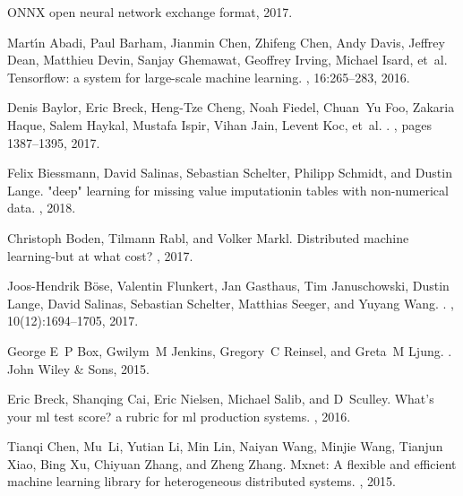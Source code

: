 \documentclass[11pt]{article}
\begin{document}
% 	
% 	


\begin{thebibliography}{10}

{ONNX} open neural network exchange format, 2017.

Mart{\'\i}n Abadi, Paul Barham, Jianmin Chen, Zhifeng Chen, Andy Davis, Jeffrey
  Dean, Matthieu Devin, Sanjay Ghemawat, Geoffrey Irving, Michael Isard, et~al.
\newblock Tensorflow: a system for large-scale machine learning.
, 16:265--283, 2016.

Denis Baylor, Eric Breck, Heng-Tze Cheng, Noah Fiedel, Chuan~Yu Foo, Zakaria
  Haque, Salem Haykal, Mustafa Ispir, Vihan Jain, Levent Koc, et~al.
.
, pages 1387--1395, 2017.

Felix Biessmann, David Salinas, Sebastian Schelter, Philipp Schmidt, and Dustin
  Lange.
\newblock "deep" learning for missing value imputationin tables with
  non-numerical data.
, 2018.

Christoph Boden, Tilmann Rabl, and Volker Markl.
\newblock Distributed machine learning-but at what cost?
, 2017.

Joos-Hendrik B{\"o}se, Valentin Flunkert, Jan Gasthaus, Tim Januschowski,
  Dustin Lange, David Salinas, Sebastian Schelter, Matthias Seeger, and Yuyang
  Wang.
.
, 10(12):1694--1705, 2017.

George E~P Box, Gwilym~M Jenkins, Gregory~C Reinsel, and Greta~M Ljung.
.
\newblock John Wiley \& Sons, 2015.

Eric Breck, Shanqing Cai, Eric Nielsen, Michael Salib, and D~Sculley.
\newblock What’s your ml test score? a rubric for ml production systems.
, 2016.

Tianqi Chen, Mu~Li, Yutian Li, Min Lin, Naiyan Wang, Minjie Wang, Tianjun Xiao,
  Bing Xu, Chiyuan Zhang, and Zheng Zhang.
\newblock Mxnet: A flexible and efficient machine learning library for
  heterogeneous distributed systems.
, 2015.


\end{thebibliography}
\end{document}
